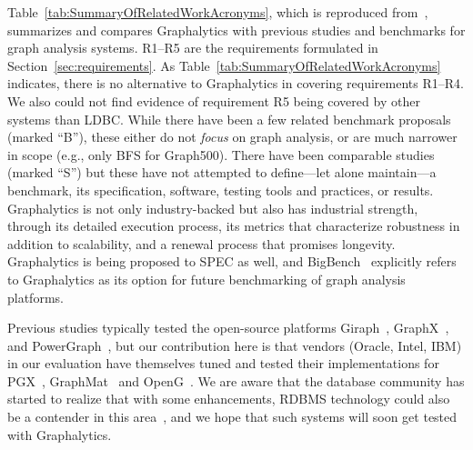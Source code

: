 Table~\ref{tab:SummaryOfRelatedWorkAcronyms}, which is reproduced from~\cite{DBLP:journals/pvldb/IosupHNHPMCCSATXNB16}, summarizes and compares Graphalytics with previous studies and benchmarks for graph analysis systems. R1--R5 are the requirements formulated in Section~\ref{sec:requirements}. 
As Table~\ref{tab:SummaryOfRelatedWorkAcronyms} indicates, there is no alternative to Graphalytics in covering requirements R1--R4. We also could not find evidence of requirement R5 being covered by other systems than LDBC.
While there have been a few related benchmark proposals (marked ``B''), these either do not {\em focus} on graph analysis, or are much narrower in scope (e.g., only BFS for Graph500).
There have been comparable studies (marked ``S'') but these have not attempted to define---let alone maintain---a benchmark, its specification, software, testing tools and practices, or results.
Graphalytics is not only industry-backed but also has industrial strength, through its detailed execution process, its metrics that characterize robustness in addition to scalability, and a renewal process that promises longevity.
Graphalytics is being proposed to SPEC as well, and BigBench~\cite{DBLP:conf/sigmod/GhazalRHRPCJ13,DBLP:conf/sigmod/RablFDJG15} explicitly refers to Graphalytics as its option for future benchmarking of graph analysis platforms. 


Previous studies typically tested the open-source platforms Giraph~\cite{giraph}, GraphX~\cite{xin2013graphx}, and 
PowerGraph~\cite{gonzalez2012powergraph}, but our contribution here is that vendors (Oracle, Intel, IBM) in our evaluation have themselves tuned and tested their implementations for PGX~\cite{DBLP:conf/sc/HongDMLVC15}, GraphMat~\cite{sundaram2015graphmat} and OpenG~\cite{DBLP:conf/sc/NaiXTKL15}. We are aware that the database community has started to realize that with some enhancements, RDBMS technology could also be a contender in this area~\cite{fan2015case,jindal2014vertexica}, and we hope that such systems will soon get tested with Graphalytics. 

